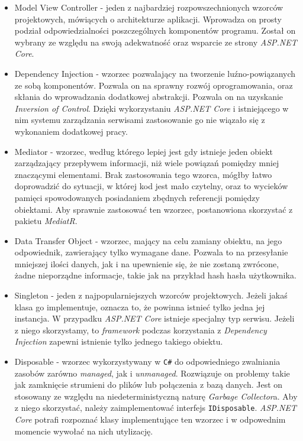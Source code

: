 \begin{itemize}
	\item Model View Controller - jeden z najbardziej rozpowszechnionych wzorców projektowych, mówiących o architekturze aplikacji. Wprowadza on prosty podział odpowiedzialności poszczególnych komponentów programu. Został on wybrany ze względu na swoją adekwatność oraz wsparcie ze strony \emph{ASP.NET Core}.
	\item Dependency Injection - wzorzec pozwalający na tworzenie luźno-powiązanych ze sobą komponentów. Pozwala on na sprawny rozwój oprogramowania, oraz skłania do wprowadzania dodatkowej abstrakcji. Pozwala on na uzyskanie \emph{Inversion of Control}. Dzięki wykorzystaniu \emph{ASP.NET Core} i istniejącego w nim systemu zarządzania serwisami zastosowanie go nie wiązało się z wykonaniem dodatkowej pracy.
	\item Mediator - wzorzec, według którego lepiej jest gdy istnieje jeden obiekt zarządzający przepływem informacji, niż wiele powiązań pomiędzy mniej znaczącymi elementami. Brak zastosowania tego wzorca, mógłby łatwo doprowadzić do sytuacji, w której kod jest mało czytelny, oraz to wycieków pamięci spowodowanych posiadaniem zbędnych referencji pomiędzy obiektami. Aby sprawnie zastosować ten wzorzec, postanowiona skorzystać z pakietu \emph{MediatR}.
	\item Data Transfer Object - wzorzec, mający na celu zamiany obiektu, na jego odpowiednik, zawierający tylko wymagane dane. Pozwala to na przesyłanie mniejszej ilości danych, jak i na upewnienie się, że nie zostaną zwrócone, żadne nieporządne informacje, takie jak na przykład hash hasła użytkownika.
	\item Singleton - jeden z najpopularniejszych wzorców projektowych. Jeżeli jakaś klasa go implementuje, oznacza to, że powinna istnieć tylko jedna jej instancja. W przypadku \emph{ASP.NET Core} istnieje specjalny typ serwisu. Jeżeli z niego skorzystamy, to \emph{framework} podczas korzystania z \emph{Dependency Injection} zapewni istnienie tylko jednego takiego obiektu.
	\item Disposable - wzorzec wykorzystywany w \texttt{C\#} do odpowiedniego zwalniania zasobów zarówno \emph{managed}, jak i \emph{unmanaged}. Rozwiązuje on problemy takie jak zamknięcie strumieni do plików lub połączenia z bazą danych. Jest on stosowany ze względu na niedeterministyczną naturę \emph{Garbage Collector}a. Aby z niego skorzystać, należy zaimplementować interfejs \texttt{IDisposable}. \emph{ASP.NET Core} potrafi rozpoznać klasy implementujące ten wzorzec i w odpowednim momencie wywołać na nich utylizację.
\end{itemize}

